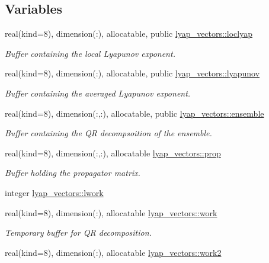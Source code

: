 \subsection*{Variables}
\begin{DoxyCompactItemize}
\item 
real(kind=8), dimension(\+:), allocatable, public \hyperlink{namespacelyap__vectors_a85e15a0071ac9c6857316d72152be731}{lyap\+\_\+vectors\+::loclyap}
\begin{DoxyCompactList}\small\item\em Buffer containing the local Lyapunov exponent. \end{DoxyCompactList}\item 
real(kind=8), dimension(\+:), allocatable, public \hyperlink{namespacelyap__vectors_a9bf23b3cf7aebbfe17422bbd63e95bab}{lyap\+\_\+vectors\+::lyapunov}
\begin{DoxyCompactList}\small\item\em Buffer containing the averaged Lyapunov exponent. \end{DoxyCompactList}\item 
real(kind=8), dimension(\+:,\+:), allocatable, public \hyperlink{namespacelyap__vectors_a23c35fd358f7646818d0637993f0078b}{lyap\+\_\+vectors\+::ensemble}
\begin{DoxyCompactList}\small\item\em Buffer containing the QR decompsoition of the ensemble. \end{DoxyCompactList}\item 
real(kind=8), dimension(\+:,\+:), allocatable \hyperlink{namespacelyap__vectors_a64ed59283a3d1411d14735b924b5794b}{lyap\+\_\+vectors\+::prop}
\begin{DoxyCompactList}\small\item\em Buffer holding the propagator matrix. \end{DoxyCompactList}\item 
integer \hyperlink{namespacelyap__vectors_a217e531a819065ea8ebc1548ca82d5e1}{lyap\+\_\+vectors\+::lwork}
\item 
real(kind=8), dimension(\+:), allocatable \hyperlink{namespacelyap__vectors_ac6e7ade9ca919e7183c90eb20f820ce4}{lyap\+\_\+vectors\+::work}
\begin{DoxyCompactList}\small\item\em Temporary buffer for QR decomposition. \end{DoxyCompactList}\item 
real(kind=8), dimension(\+:), allocatable \hyperlink{namespacelyap__vectors_a1575bc16fe4704466132dea4aeb2d067}{lyap\+\_\+vectors\+::work2}

\end{DoxyCompactItemize}
